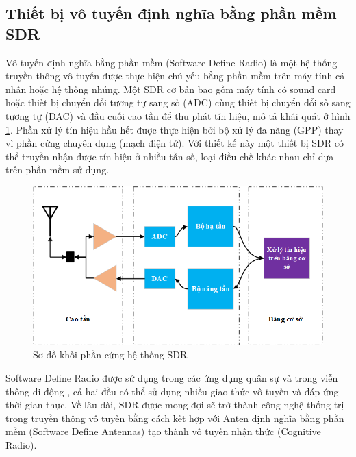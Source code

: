 \subsection{Thiết bị vô tuyến định nghĩa bằng phần mềm SDR}

Vô tuyến định nghĩa bằng phần mềm (Software Define Radio) là một hệ thống truyền thông vô tuyến được thực hiện chủ yếu bằng phần mềm trên máy tính cá nhân hoặc hệ thống nhúng. Một SDR cơ bản bao gồm máy tính có sound card  hoặc thiết bị chuyển đổi tương tự sang số (ADC) cùng thiết bị chuyển đổi số sang tương tự (DAC) và đầu cuối cao tần để thu phát tín hiệu, mô tả khái quát ở hình \ref{fig:structSDR}. Phần xử lý tín hiệu hầu hết được thực hiện bởi bộ xử lý đa năng (GPP) thay vì phần cứng chuyên dụng (mạch điện tử). Với thiết kế này một thiết bị SDR có thể truyền nhận được tín hiệu ở nhiều tần số,  loại điều chế khác nhau chỉ dựa trên phần mềm sử dụng.

\begin{figure} [!htb]
	\centering
	\includegraphics[width=1\linewidth]{figures/structSDR.png}
	\caption{Sơ đồ khối phần cứng hệ thống SDR}
	\label{fig:structSDR}
\end{figure}

Software Define Radio được sử dụng trong các ứng dụng quân sự \cite{Bergstrom2002} và trong viễn thông di động \cite{VanRijsbergen, Gomez-Miguelez2016}, cả hai đều có thể sử dụng nhiều giao thức vô tuyến và đáp ứng thời gian thực. Về lâu dài, SDR được mong đợi sẽ trở thành công nghệ thống trị trong truyền thông vô tuyến bằng cách kết hợp với Anten định nghĩa bằng phần mềm (Software Define Antennas) tạo thành vô tuyến nhận thức (Cognitive Radio).

